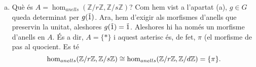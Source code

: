 \documentclass[../main.tex]{subfiles}
\begin{document}
\begin{sol}
\begin{enumerate}[(a)]
    
    \item Què és $A = \hom_{anells}(\mathbb{Z}/r\mathbb{Z},\mathbb{Z}/s\mathbb{Z})$? Com hem vist a l'apartat (a), $g\in G$ queda determinat per $g(\Tilde{1})$. Ara, hem d'exigir als morfismes d'anells que preservin la unitat, aleshores $g(\Tilde{1}) = \Tilde{1}$. Aleshores hi ha només un morfisme d'anells en $A$. És a dir, $A = \{*\}$ i aquest asterisc és, de fet, $\pi$ (el morfisme de pas al quocient. Es té
    \begin{equation}
        \notag
        \hom_{anells}(\mathbb{Z}/r\mathbb{Z},\mathbb{Z}/s\mathbb{Z})\cong\hom_{anells}(\mathbb{Z}/r\mathbb{Z},\mathbb{Z}/d\mathbb{Z}) = \{\pi\}.
    \end{equation}
\end{enumerate}
\end{sol}
\end{document}
